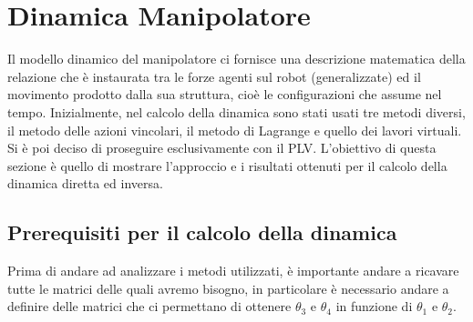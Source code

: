\section{Dinamica Manipolatore}
Il modello dinamico del manipolatore ci fornisce una descrizione matematica della relazione che è instaurata tra le forze agenti sul robot (generalizzate) ed il movimento prodotto dalla sua struttura, cioè le configurazioni che assume nel tempo. Inizialmente, nel calcolo della dinamica sono stati usati tre metodi diversi, il metodo delle azioni vincolari, il metodo di Lagrange e quello dei lavori virtuali. Si è poi deciso di proseguire esclusivamente con il PLV. L'obiettivo di questa sezione è quello di mostrare l'approccio e i risultati ottenuti per il calcolo della dinamica diretta ed inversa.
\subsection{Prerequisiti per il calcolo della dinamica}\label{sec:prerequisiti-dinamica}
Prima di andare ad analizzare i metodi utilizzati, è importante andare a ricavare tutte le matrici delle quali avremo bisogno, in particolare è necessario andare a definire delle matrici che ci permettano di ottenere $\theta_3$ e $\theta_4$ in funzione di $\theta_1$ e $\theta_2$.

